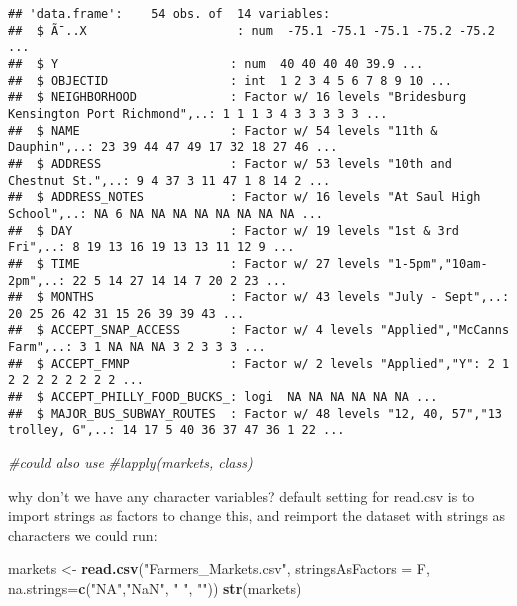 \documentclass[]{article}
\newenvironment{Shaded}{\begin{snugshade}}{\end{snugshade}}
\newcommand{\KeywordTok}[1]{\textcolor[rgb]{0.13,0.29,0.53}{\textbf{#1}}}
\newcommand{\DataTypeTok}[1]{\textcolor[rgb]{0.13,0.29,0.53}{#1}}
\newcommand{\StringTok}[1]{\textcolor[rgb]{0.31,0.60,0.02}{#1}}
\newcommand{\CommentTok}[1]{\textcolor[rgb]{0.56,0.35,0.01}{\textit{#1}}}
\newcommand{\NormalTok}[1]{#1}
\begin{document}
\begin{verbatim}
## 'data.frame':    54 obs. of  14 variables:
##  $ Ã¯..X                     : num  -75.1 -75.1 -75.1 -75.2 -75.2 ...
##  $ Y                        : num  40 40 40 40 39.9 ...
##  $ OBJECTID                 : int  1 2 3 4 5 6 7 8 9 10 ...
##  $ NEIGHBORHOOD             : Factor w/ 16 levels "Bridesburg Kensington Port Richmond",..: 1 1 1 3 4 3 3 3 3 3 ...
##  $ NAME                     : Factor w/ 54 levels "11th & Dauphin",..: 23 39 44 47 49 17 32 18 27 46 ...
##  $ ADDRESS                  : Factor w/ 53 levels "10th and Chestnut St.",..: 9 4 37 3 11 47 1 8 14 2 ...
##  $ ADDRESS_NOTES            : Factor w/ 16 levels "At Saul High School",..: NA 6 NA NA NA NA NA NA NA NA ...
##  $ DAY                      : Factor w/ 19 levels "1st & 3rd Fri",..: 8 19 13 16 19 13 13 11 12 9 ...
##  $ TIME                     : Factor w/ 27 levels "1-5pm","10am-2pm",..: 22 5 14 27 14 14 7 20 2 23 ...
##  $ MONTHS                   : Factor w/ 43 levels "July - Sept",..: 20 25 26 42 31 15 26 39 39 43 ...
##  $ ACCEPT_SNAP_ACCESS       : Factor w/ 4 levels "Applied","McCanns Farm",..: 3 1 NA NA NA 3 2 3 3 3 ...
##  $ ACCEPT_FMNP              : Factor w/ 2 levels "Applied","Y": 2 1 2 2 2 2 2 2 2 2 ...
##  $ ACCEPT_PHILLY_FOOD_BUCKS_: logi  NA NA NA NA NA NA ...
##  $ MAJOR_BUS_SUBWAY_ROUTES  : Factor w/ 48 levels "12, 40, 57","13 trolley, G",..: 14 17 5 40 36 37 47 36 1 22 ...
\end{verbatim}

\begin{Shaded}
\begin{Highlighting}[]
\CommentTok{#could also use }
\CommentTok{#lapply(markets, class)}
\end{Highlighting}
\end{Shaded}

why don't we have any character variables? default setting for read.csv
is to import strings as factors to change this, and reimport the dataset
with strings as characters we could run:

\begin{Shaded}
\begin{Highlighting}[]
\NormalTok{markets <-}\StringTok{ }\KeywordTok{read.csv}\NormalTok{(}\StringTok{"Farmers_Markets.csv"}\NormalTok{, }\DataTypeTok{stringsAsFactors =}\NormalTok{ F, }\DataTypeTok{na.strings=}\KeywordTok{c}\NormalTok{(}\StringTok{"NA"}\NormalTok{,}\StringTok{"NaN"}\NormalTok{, }\StringTok{" "}\NormalTok{, }\StringTok{""}\NormalTok{))}
\KeywordTok{str}\NormalTok{(markets)}
\end{Highlighting}
\end{Shaded}
\end{document}
